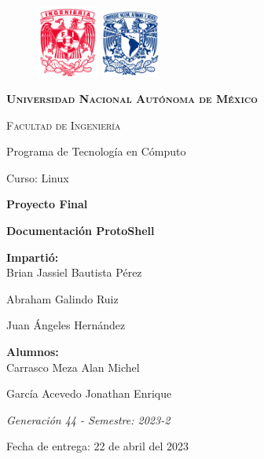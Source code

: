 \thispagestyle{empty}
\begin{figure}[ht]
    \includegraphics[width=2cm]{figurasPortada/escudofi_rojo.jpg}
\endminipage
{}
    \includegraphics[height = 2.25cm ,width=2cm]{figurasPortada/escudounam_azul.jpg}
\endminipage
\end{figure}

\vspace{0.07cm}

\begin{center}
{\scshape\LARGE \textbf{Universidad Nacional Autónoma de México} \par}
{\scshape\Large Facultad de Ingeniería\par}

{\Large Programa de Tecnología en Cómputo}

 {\Large Curso: Linux}

\vspace{0.5cm}

\begin{center}
    {\LARGE  \bfseries{Proyecto Final} \\}
{\LARGE\bfseries Documentación ProtoShell\par}
\vspace{0.5cm}
    \LARGE	{ \textbf{Impartió:}}\\%
\large		{Brian Jassiel Bautista Pérez}

\large {Abraham Galindo Ruiz}

\large {Juan Ángeles Hernández}

\vspace{0.5cm}

\LARGE	{ \textbf{Alumnos:}}\\%

\normalsize		{Carrasco Meza Alan Michel}

\normalsize	 {García Acevedo Jonathan Enrique}

\vspace{0.5cm}

{\large \textit{Generación 44 - Semestre: 2023-2}}

{\Large Fecha de entrega: 22 de abril del 2023\par}
\end{center}

\end{center}